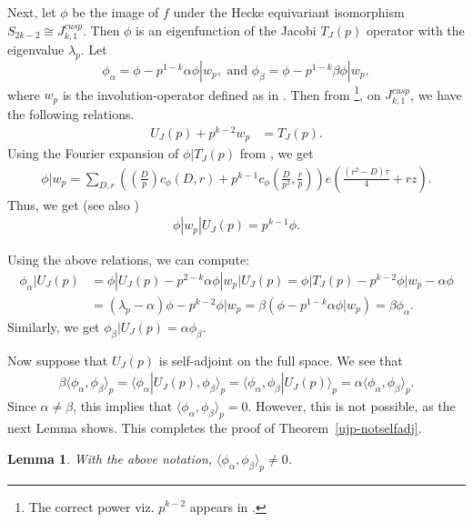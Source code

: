 \documentclass[11pt]{amsart}
\numberwithin{equation}{section}
\theoremstyle{plain}
\newtheorem{lem}[thm]{Lemma}
\theoremstyle{definition}
\newcommand{\lan}{\langle }
\newcommand{\ran}{\rangle}
\begin{document}
Next, let $\phi$ be the image of $f$ under the Hecke equivariant isomorphism $S_{2k-2}\cong J_{k,1}^{cusp}$. Then $\phi$ is an eigenfunction of the Jacobi $T_J(p)$ operator with the eigenvalue $\lambda_p$. Let 
\[ \phi_\alpha= \phi -p^{1-k}\alpha \phi|w_p,  \text{ and } \phi_\beta= \phi -p^{1-k} \beta \phi|w_p ,\]
where $w_p$ is the involution-operator defined as in \cite{manickam1993saito}. Then from \cite[Proposition~6]{manickam1993saito}\footnote{The correct power viz. $p^{k-2}$ appears in \cite{manickam1993saito}.}, on $J_{k,1}^{cusp}$, we have the following relations.
\begin{align}
U_J(p) +p^{k-2} w_p &= T_J(p).
\end{align}
Using the Fourier expansion of $\phi|T_J(p)$ from \cite[Theorem 4.5]{EZ}, we get
\begin{align}
    \phi|w_p= \sum_{D, r}\left(\left(\frac{D}{p}\right)c_\phi(D, r)+p^{k-1}c_\phi(\frac{D}{p^2}, \frac{r}{p}) \right)e\left(\frac{(r^2-D)\tau}{4}+rz\right).
\end{align}
Thus, we get (see also \cite[(47)]{MR})
\begin{align}
    \phi|w_p|U_J(p)=p^{k-1}\phi.
\end{align}

Using the above relations, we can compute:
\begin{align}
    \phi_\alpha|U_J(p) &= \phi|U_J(p) - p^{2-k}\alpha \phi|w_p|U_J(p)=\phi| T_J(p) -p^{k-2} \phi|w_p -\alpha \phi\\
    &= (\lambda_p - \alpha) \phi - p^{k-2}\phi|w_p= \beta (\phi - p^{1-k} \alpha \phi|w_p)= \beta\phi_\alpha.
\end{align}
Similarly, we get $\phi_\beta|U_J(p)=\alpha\phi_\beta$. 

Now suppose that $U_J(p)$ is self-adjoint on the full space. We see that
\begin{align}
    \beta\lan \phi_\alpha, \phi_\beta\ran_p=\lan \phi_\alpha|U_J(p), \phi_\beta\ran_p= \lan \phi_\alpha, \phi_\beta|U_J(p)\ran_p= \alpha \lan \phi_\alpha, \phi_\beta\ran_p.
\end{align}
Since $\alpha \neq \beta$, this implies that $\lan \phi_\alpha, \phi_\beta\ran_p =0$. However, this is not possible, as the next Lemma shows. This completes the proof of Theorem~\ref{ujp-notselfadj}.

\begin{lem}\label{lem:phialphabeta}
   With the above notation, $\lan \phi_\alpha, \phi_\beta\ran_p \neq 0$.
\end{lem}
\end{document}
